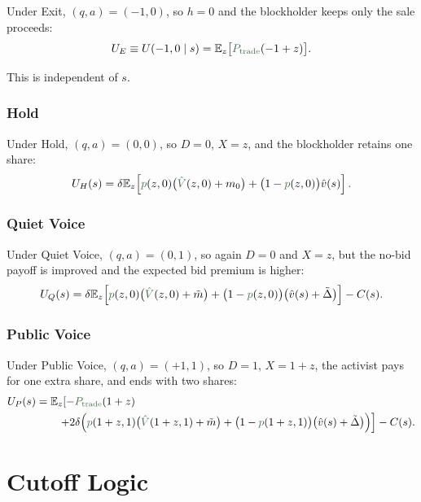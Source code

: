\documentclass[11pt,a4paper]{article}
\theoremstyle{definition}
\theoremstyle{plain}
\theoremstyle{remark}
\newcommand{\E}{\mathbb{E}}
\newcommand{\1}{\mathbf{1}}
\newcommand{\outcome}[1]{{\color{ForestGreen!50!black}#1}}
\begin{document}
Under Exit, $(q,a)=(-1,0)$, so $h=0$ and the blockholder keeps only the sale proceeds:
\begin{equation}
U_E \equiv U(-1,0\mid s)
=
\E_z\big[\outcome{P_{\textup{trade}}}(-1+z)\big].
\label{eq:UE}
\end{equation}

This is independent of $s$.

\subsubsection*{Hold}

Under Hold, $(q,a)=(0,0)$, so $D=0$, $X=z$, and the blockholder retains one share:
\begin{equation}
U_H(s)
=
\delta \E_z\!\left[
\outcome{p}(z,0)\big(\outcome{\hat V}(z,0)+m_0\big)
+
\big(1-\outcome{p}(z,0)\big)\hat v(s)
\right].
\label{eq:UH}
\end{equation}

\subsubsection*{Quiet Voice}

Under Quiet Voice, $(q,a)=(0,1)$, so again $D=0$ and $X=z$, but the no-bid payoff is improved and the expected bid premium is higher:
\begin{equation}
U_Q(s)
=
\delta \E_z\!\left[
\outcome{p}(z,0)\big(\outcome{\hat V}(z,0)+\tilde m\big)
+
\big(1-\outcome{p}(z,0)\big)\big(\hat v(s)+\tilde{\Delta}\big)
\right]
- C(s).
\label{eq:UQ}
\end{equation}

\subsubsection*{Public Voice}

Under Public Voice, $(q,a)=(+1,1)$, so $D=1$, $X=1+z$, the activist pays for one extra share, and ends with two shares:
\begin{align}
U_P(s)
&=
\E_z\!\left[
-\outcome{P_{\textup{trade}}}(1+z)
\right. \nonumber\\
&\qquad\left.
+ 2\delta\Big(
\outcome{p}(1+z,1)\big(\outcome{\hat V}(1+z,1)+\tilde m\big)
+ \big(1-\outcome{p}(1+z,1)\big)\big(\hat v(s)+\tilde{\Delta}\big)
\Big)
\right]
- C(s).
\label{eq:UP}
\end{align}

\section{Cutoff Logic}
\end{document}

